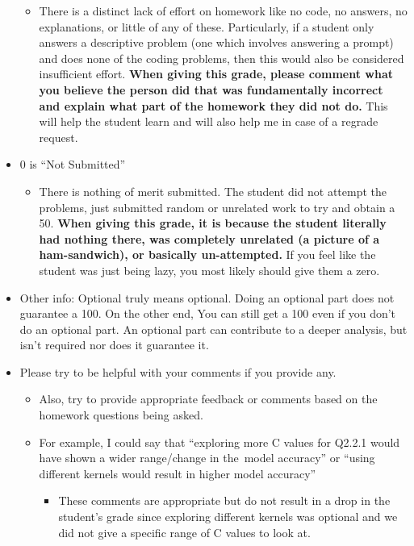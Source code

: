 \documentclass[
]{book}
\providecommand{\tightlist}{%
  \setlength{\itemsep}{0pt}\setlength{\parskip}{0pt}}
\begin{document}
\begin{itemize}
  \begin{itemize}
  \tightlist
  \item
    There is a distinct lack of effort on homework like no code, no answers, no explanations, or little of any of these. Particularly, if a student only answers a descriptive problem (one which involves answering a prompt) and does none of the coding problems, then this would also be considered insufficient effort. \textbf{When giving this grade, please comment what you believe the person did that was fundamentally incorrect and explain what part of the homework they did not do.} This will help the student learn and will also help me in case of a regrade request.
  \end{itemize}
\item
  0 is ``Not Submitted''

  \begin{itemize}
  \tightlist
  \item
    There is nothing of merit submitted. The student did not attempt the problems, just submitted random or unrelated work to try and obtain a 50. \textbf{When giving this grade, it is because the student literally had nothing there, was completely unrelated (a picture of a ham-sandwich), or basically un-attempted.} If you feel like the student was just being lazy, you most likely should give them a zero.
  \end{itemize}
\item
  Other info: Optional truly means optional. Doing an optional part does not guarantee a 100. On the other end, You can still get a 100 even if you don't do an optional part. An optional part can contribute to a deeper analysis, but isn't required nor does it guarantee it.
\item
  Please try to be helpful with your comments if you provide any.

  \begin{itemize}
  \tightlist
  \item
    Also, try to provide appropriate feedback or comments based on the homework questions being asked.
  \item
    For example, I could say that ``exploring more C values for Q2.2.1 would have shown a wider range/change in the~model accuracy'' or ``using different kernels would result in higher model accuracy''

    \begin{itemize}
    \tightlist
    \item
      These comments are appropriate but do not result in a drop in the student's grade since exploring different kernels was optional and we did not give a specific range of C values to look at.
    \end{itemize}
  \end{itemize}
\end{itemize}
\end{document}
